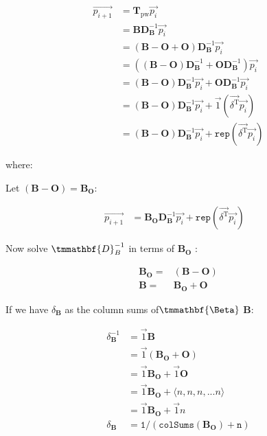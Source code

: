 \documentclass[11pt]{article}
\begin{document}
\begin{align}
  \overrightarrow{p_{i + 1}} & = \mathbf{T}_{\mathrm{pw}}
  \overrightarrow{p_i}\\
& = \mathbf{BD}_{\mathbf{B}}^{- 1}
  \overrightarrow{p_i}\\
  & = \left( \mathbf{B} - \mathbf{O} + \mathbf{O} \right)
  \mathbf{D}_{\mathbf{B}}^{- 1} \overrightarrow{p_i}\\
  & = \left( \left( \mathbf{B} - \mathbf{O} \right)
  \mathbf{D}_{\mathbf{B}}^{- 1} + \mathbf{OD}_{\mathbf{B}}^{- 1} \right)
  \overrightarrow{p_i}\\
  & = \left( \mathbf{B} - \mathbf{O} \right) \mathbf{D}_{\mathbf{B}}^{- 1}
  \overrightarrow{p_i} + \mathbf{OD}_{\mathbf{B}}^{- 1} \overrightarrow{p_i}\\
  & = \left( \mathbf{B} - \mathbf{O} \right) \mathbf{D}_{\mathbf{B}}^{- 1}
  \overrightarrow{p_i} + \vec{1} (\overrightarrow{\delta^{\mathrm{T}}}
  \overrightarrow{p_i}) \\
  & = \left( \mathbf{B} - \mathbf{O} \right) \mathbf{D}_{\mathbf{B}}^{- 1}
  \overrightarrow{p_i} + \mathtt{rep} (\overrightarrow{\delta^{\mathrm{T}}}
  \overrightarrow{p_i})
\end{align}

where:


Let \((\mathbf{B}-\mathbf{O}) = \mathbf{B_{\mathbf{O}}}\):

\begin{eqnarray*}
  \overrightarrow{p_{i + 1}} & = \mathbf{B_{\mathbf{O}}} \mathbf{D}_{\mathbf{B}}^{- 1}
  \overrightarrow{p_i} + \mathtt{rep} (\overrightarrow{\delta^{\mathrm{T}}}
  \overrightarrow{p_i}) &
\end{eqnarray*}

Now solve \(\tmmathbf{D}_B^{- 1}\) in terms of \(\mathbf{B_{O}}\) :

\begin{align}
  \mathbf{B}_{\mathbf{\mathbf{O}}} = & (\mathbf{B}-\mathbf{O})\\
  \mathbf{B} = & \mathbf{B}_{\mathbf{\mathbf{O}}}
  +\mathbf{O}
\end{align}

If we have \(\delta_{\mathbf{B}}\) as the column sums of\(\tmmathbf{\Beta}\) \(\mathbf{B}\):

\begin{align}
\delta^{-1}_{\mathbf{B}} &= \vec{1}\mathbf{B} \\
&= \vec{1} \left( \mathbf{B_{O}} + \mathbf{O}\right) \\
&= \vec{1}  \mathbf{B_{O}} + \vec{1}\mathbf{O} \\
&= \vec{1} \mathbf{B_{\mathbf{O}}} + \langle n, n, n, ... n \rangle \\
&= \vec{1} \mathbf{B_{\mathbf{O}}} + \vec{1} n \\
\delta_{\mathbf{B}}&=\mathtt{1/(colSums(\mathbf{B_{O}}) + n )}
\end{align}
\end{document}
